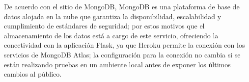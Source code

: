 De acuerdo con el sitio de MongoDB\cite{mongodb_mongodb_2020}, MongoDB es una plataforma de base de datos alojada en la nube que garantiza la disponibilidad, escalabilidad y cumplimiento de estándares de seguridad; por estos motivos que el almacenamiento de los datos está a cargo de este servicio, ofreciendo la conectividad con la aplicación Flask, ya que Heroku permite la conexión con los servicios de MongoDB Atlas; la configuración para la conexión no cambia si se están realizando pruebas en un ambiente local antes de exponer los últimos cambios al público.